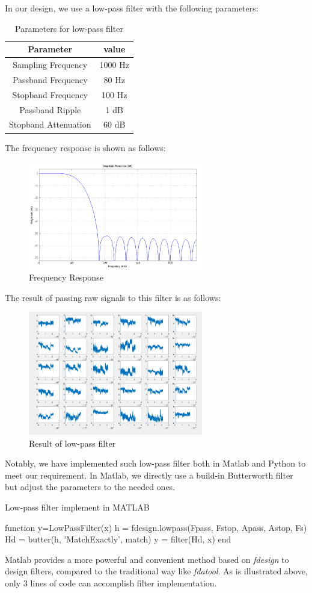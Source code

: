 \documentclass[conference]{IEEEtran}
\begin{document}
In our design, we use a low-pass filter with the following parameters:
\begin{table}[H]
\centering
\begin{tabular}{|c|c|}
\hline
Parameter & value \\
\hline
\hline
Sampling Frequency & 1000 Hz \\
\hline
Passband Frequency & 80 Hz \\
\hline
Stopband Frequency & 100 Hz \\
\hline
Passband Ripple & 1 dB \\
\hline
Stopband Attenuation & 60 dB \\
\hline
\end{tabular}
\caption{Parameters for low-pass filter}
\end{table}

The frequency response is shown as follows:
\begin{figure}[H]
\centering
\includegraphics[width=3in]{FR.png}
\caption{Frequency Response}
\end{figure}
The result of passing raw signals to this filter is as follows:
\begin{figure}[H]
\centering
\includegraphics[width=3in]{LPF.png}
\caption{Result of low-pass filter}
\end{figure}

Notably, we have implemented such low-pass filter both in Matlab and Python to meet our requirement.
In Matlab, we directly use a build-in Butterworth filter but adjust the parameters to the needed ones.
\begin{algorithm}
	\centering
	\caption{Low-pass filter implement in MATLAB}
	\begin{algorithmic}
	\STATE function y=LowPassFilter(x) 
	\STATE \qquad h = fdesign.lowpass(Fpass, Fstop, Apass, Astop, Fs) 
	\STATE \qquad Hd = butter(h, 'MatchExactly', match) 
	\STATE \qquad y = filter(Hd, x) 
	\STATE end
	\end{algorithmic}
\end{algorithm}
Matlab provides a more powerful and convenient method based on \emph{fdesign} to design filters, compared to the traditional way like \emph{fdatool}. As is illustrated above, only 3 lines of code can accomplish filter implementation.
\end{document}
